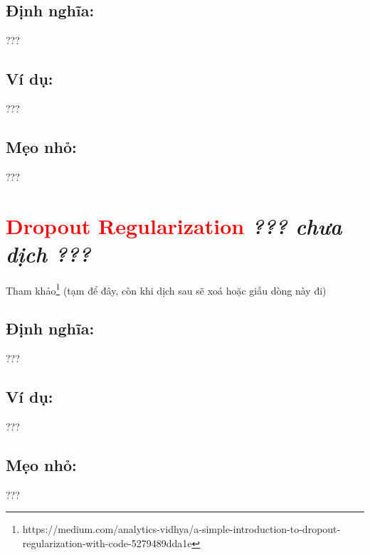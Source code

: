 \subsection*{Định nghĩa:}
???
\subsection*{Ví dụ:}
???
\subsection*{Mẹo nhỏ:}
???
\section*{\huge \textcolor{Red}{Dropout Regularization}  \small \textit{??? chưa dịch ???} }
Tham khảo\footnote{https://medium.com/analytics-vidhya/a-simple-introduction-to-dropout-regularization-with-code-5279489dda1e} (tạm để đây, còn khi dịch sau sẽ xoá hoặc giấu dòng này đi)
\subsection*{Định nghĩa:}
???
\subsection*{Ví dụ:}
???
\subsection*{Mẹo nhỏ:}
???
